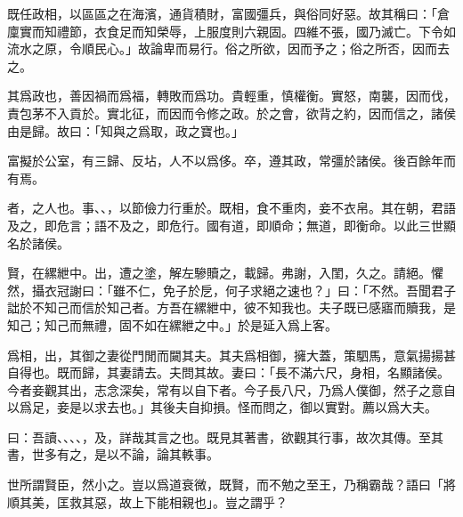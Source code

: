 既任政相，以區區之在海濱，通貨積財，富國彊兵，與俗同好惡。故其稱曰：「倉廩實而知禮節，衣食足而知榮辱，上服度則六親固。四維不張，國乃滅亡。下令如流水之原，令順民心。」故論卑而易行。俗之所欲，因而予之；俗之所否，因而去之。

其爲政也，善因禍而爲福，轉敗而爲功。貴輕重，慎權衡。實怒，南襲，因而伐，責包茅不入貢於。實北征，而因而令修之政。於之會，欲背之約，因而信之，諸侯由是歸。故曰：「知與之爲取，政之寶也。」

富擬於公室，有三歸、反坫，人不以爲侈。卒，遵其政，常彊於諸侯。後百餘年而有焉。

者，之人也。事、、，以節儉力行重於。既相，食不重肉，妾不衣帛。其在朝，君語及之，即危言；語不及之，即危行。國有道，即順命；無道，即衡命。以此三世顯名於諸侯。

賢，在縲紲中。出，遭之塗，解左驂贖之，載歸。弗謝，入閨，久之。請絕。懼然，攝衣冠謝曰：「雖不仁，免子於戹，何子求絕之速也？」曰：「不然。吾聞君子詘於不知己而信於知己者。方吾在縲紲中，彼不知我也。夫子既已感寤而贖我，是知己；知己而無禮，固不如在縲紲之中。」於是延入爲上客。

爲相，出，其御之妻從門閒而闚其夫。其夫爲相御，擁大蓋，策駟馬，意氣揚揚甚自得也。既而歸，其妻請去。夫問其故。妻曰：「長不滿六尺，身相，名顯諸侯。今者妾觀其出，志念深矣，常有以自下者。今子長八尺，乃爲人僕御，然子之意自以爲足，妾是以求去也。」其後夫自抑損。怪而問之，御以實對。薦以爲大夫。

曰：吾讀、、、、，及，詳哉其言之也。既見其著書，欲觀其行事，故次其傳。至其書，世多有之，是以不論，論其軼事。

世所謂賢臣，然小之。豈以爲道衰微，既賢，而不勉之至王，乃稱霸哉？語曰「將順其美，匡救其惡，故上下能相親也」。豈之謂乎？

